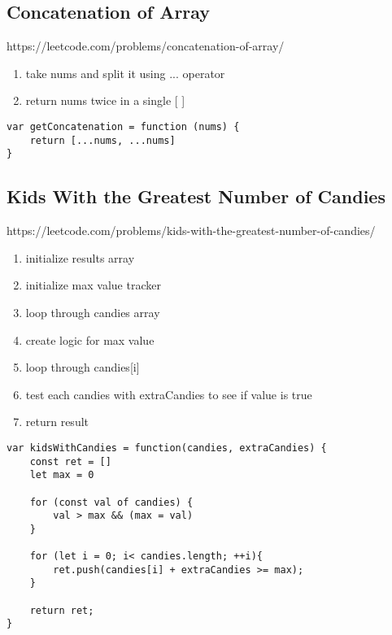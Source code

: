 \documentclass[10pt]{article}
\begin{document}
\pagebreak
\medskip %
\subsection{Concatenation of Array}
https://leetcode.com/problems/concatenation-of-array/

\begin{enumerate}
	\item take nums and split it using ... operator
	\item return nums twice in a single [ ]
\end{enumerate}

\begin{lstlisting}[title=Solution getConcatenation, captionpos=t]
var getConcatenation = function (nums) {
    return [...nums, ...nums]
}
\end{lstlisting}
\medskip %

\pagebreak
\medskip %
\subsection{Kids With the Greatest Number of Candies}
https://leetcode.com/problems/kids-with-the-greatest-number-of-candies/

\begin{enumerate}
	\item initialize results array
	\item initialize max value tracker
	\item loop through candies array 
	\item create logic for max value
	\item loop through candies[i]
	\item test each candies with extraCandies to see if value is true 
	\item return result 
\end{enumerate}

\begin{lstlisting}[title=Solution kidsWithCandies with for-of loop, captionpos=t]
var kidsWithCandies = function(candies, extraCandies) {
    const ret = []
    let max = 0

    for (const val of candies) {
        val > max && (max = val)
    }

    for (let i = 0; i< candies.length; ++i){
        ret.push(candies[i] + extraCandies >= max);
    }

    return ret; 
}
\end{lstlisting}
\end{document}
